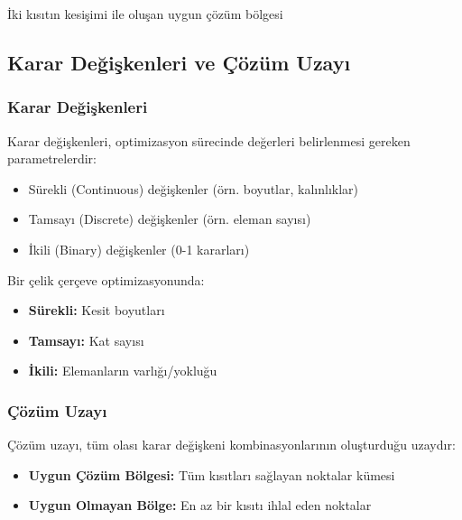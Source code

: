 \begin{marginfigure}
\centering
{}
\caption{İki kısıtın kesişimi ile oluşan uygun çözüm bölgesi}
\label{fig:feasible_region}
\end{marginfigure}

\subsection{Karar Değişkenleri ve Çözüm Uzayı}

\subsubsection{Karar Değişkenleri}
Karar değişkenleri, optimizasyon sürecinde değerleri belirlenmesi gereken parametrelerdir:
\begin{itemize}
    \item Sürekli (Continuous) değişkenler (örn. boyutlar, kalınlıklar)
    \item Tamsayı (Discrete) değişkenler (örn. eleman sayısı)
    \item İkili (Binary) değişkenler (0-1 kararları)
\end{itemize}

\begin{tcolorbox}[title=Yapısal Tasarımda Karar Değişkenleri]
Bir çelik çerçeve optimizasyonunda:
\begin{itemize}
    \item \textbf{Sürekli:} Kesit boyutları
    \item \textbf{Tamsayı:} Kat sayısı
    \item \textbf{İkili:} Elemanların varlığı/yokluğu
\end{itemize}
\end{tcolorbox}

\subsubsection{Çözüm Uzayı}
Çözüm uzayı, tüm olası karar değişkeni kombinasyonlarının oluşturduğu uzaydır:
\begin{itemize}
    \item \textbf{Uygun Çözüm Bölgesi:} Tüm kısıtları sağlayan noktalar kümesi
    \item \textbf{Uygun Olmayan Bölge:} En az bir kısıtı ihlal eden noktalar
\end{itemize}


